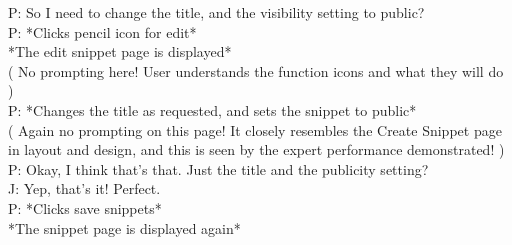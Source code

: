 P: So I need to change the title, and the visibility setting to public? \\
P: *Clicks pencil icon for edit* \\
*The edit snippet page is displayed* \\
( No prompting here! User understands the function icons and what they will do ) \\
P: *Changes the title as requested, and sets the snippet to public* \\
( Again no prompting on this page! It closely resembles the Create Snippet page in layout and design, and this is seen by the expert performance demonstrated! ) \\
P: Okay, I think that's that. Just the title and the publicity setting? \\
J: \-\hspace{1.4cm}Yep, that's it! Perfect. \\
P: *Clicks save snippets* \\
*The snippet page is displayed again*

